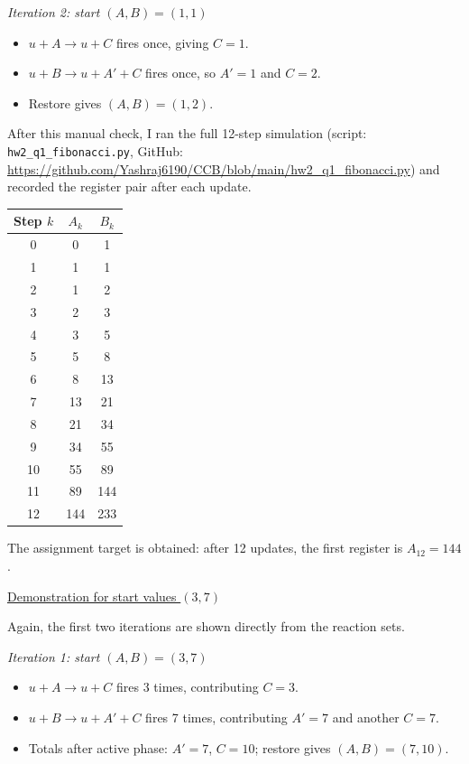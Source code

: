\documentclass[12pt]{article}
\begin{document}
\noindent\textit{Iteration 2: start $(A,B)=(1,1)$}
\begin{itemize}
\item $u + A \to u + C$ fires once, giving $C=1$.
\item $u + B \to u + A' + C$ fires once, so $A'=1$ and $C=2$.
\item Restore gives $(A,B)=(1,2)$.
\end{itemize}

After this manual check, I ran the full 12-step simulation (script: \texttt{hw2\_q1\_fibonacci.py}, GitHub: \url{https://github.com/Yashraj6190/CCB/blob/main/hw2_q1_fibonacci.py}) and recorded the register pair after each update.

\begin{center}
\begin{tabular}{c c c}
\hline
Step $k$ & $A_k$ & $B_k$ \\
\hline
0 & 0 & 1 \\
1 & 1 & 1 \\
2 & 1 & 2 \\
3 & 2 & 3 \\
4 & 3 & 5 \\
5 & 5 & 8 \\
6 & 8 & 13 \\
7 & 13 & 21 \\
8 & 21 & 34 \\
9 & 34 & 55 \\
10 & 55 & 89 \\
11 & 89 & 144 \\
12 & 144 & 233 \\
\hline
\end{tabular}
\end{center}
The assignment target is obtained: after 12 updates, the first register is $A_{12}=144$.

\medskip
\noindent\underline{Demonstration for start values $(3,7)$}

Again, the first two iterations are shown directly from the reaction sets.

\medskip
\noindent\textit{Iteration 1: start $(A,B)=(3,7)$}
\begin{itemize}
\item $u + A \to u + C$ fires 3 times, contributing $C=3$.
\item $u + B \to u + A' + C$ fires 7 times, contributing $A'=7$ and another $C=7$.
\item Totals after active phase: $A'=7$, $C=10$; restore gives $(A,B)=(7,10)$.
\end{itemize}
\end{document}
